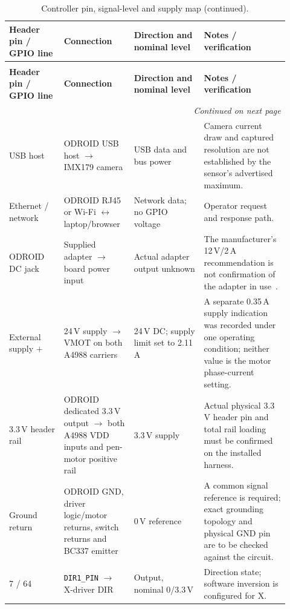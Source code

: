 \begingroup
\small
\setlength{\tabcolsep}{3pt}
\renewcommand{\arraystretch}{1.12}
\begin{longtable}{p{0.18\linewidth}p{0.22\linewidth}p{0.23\linewidth}p{0.29\linewidth}}
\caption{Controller pin, signal-level and supply map for the installed system.}\label{tab:des-pin-map}\\
\toprule
\textbf{Header pin / GPIO line} & \textbf{Connection} & \textbf{Direction and nominal level} & \textbf{Notes / verification}\\
\midrule
\endfirsthead
\caption[]{Controller pin, signal-level and supply map (continued).}\\
\toprule
\textbf{Header pin / GPIO line} & \textbf{Connection} & \textbf{Direction and nominal level} & \textbf{Notes / verification}\\
\midrule
\endhead
\midrule
\multicolumn{4}{r}{\emph{Continued on next page}}\\
\endfoot
\bottomrule
\endlastfoot
USB host & ODROID USB host $\rightarrow$ IMX179 camera & USB data and bus power & Camera current draw and captured resolution are not established by the sensor's advertised maximum.\\
Ethernet / network & ODROID RJ45 or Wi-Fi $\leftrightarrow$ laptop/browser & Network data; no GPIO voltage & Operator request and response path.\\
ODROID DC jack & Supplied adapter $\rightarrow$ board power input & Actual adapter output unknown & The manufacturer's 12\,V/2\,A recommendation is not confirmation of the adapter in use~\cite[``Power'' section, unpaginated]{odroidn2ds}.\\
External supply $+$ & 24\,V supply $\rightarrow$ VMOT on both A4988 carriers & 24\,V DC; supply limit set to 2.11\,A & A separate 0.35\,A supply indication was recorded under one operating condition; neither value is the motor phase-current setting.\\
3.3\,V header rail & ODROID dedicated 3.3\,V output $\rightarrow$ both A4988 VDD inputs and pen-motor positive rail & 3.3\,V supply & Actual physical 3.3\,V header pin and total rail loading must be confirmed on the installed harness.\\
Ground return & ODROID GND, driver logic/motor returns, switch returns and BC337 emitter & 0\,V reference & A common signal reference is required; exact grounding topology and physical GND pin are to be checked against the circuit.\\
7 / 64 & \texttt{DIR1\_PIN} $\rightarrow$ X-driver DIR & Output, nominal 0/3.3\,V & Direction state; software inversion is configured for X.\\

\end{longtable}

